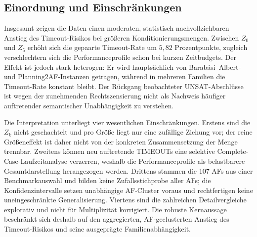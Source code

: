\subsection{Einordnung und Einschränkungen}
\label{subsec:empirical-stable-z-limitations}

Insgesamt zeigen die Daten einen moderaten, statistisch nachvollziehbaren
Anstieg des Timeout-Risikos bei größeren Konditionierungsmengen. Zwischen
\(Z_0\) und \(Z_5\) erhöht sich die gepaarte Timeout-Rate um \(5{,}82\)
Prozentpunkte, zugleich verschlechtern sich die Performanceprofile schon
bei kurzen Zeitbudgets. Der Effekt ist jedoch stark heterogen: Er wird
hauptsächlich von Barabási--Albert- und Planning2AF-Instanzen getragen,
während in mehreren Familien die Timeout-Rate konstant bleibt. Der
Rückgang beobachteter UNSAT-Abschlüsse ist wegen der zunehmenden
Rechtszensierung nicht als Nachweis häufiger auftretender semantischer
Unabhängigkeit zu verstehen.

Die Interpretation unterliegt vier wesentlichen Einschränkungen. Erstens
sind die \(Z_k\) nicht geschachtelt und pro Größe liegt nur eine zufällige
Ziehung vor; der reine Größeneffekt ist daher nicht von der konkreten
Zusammensetzung der Menge trennbar. Zweitens können neu auftretende
TIMEOUTs eine selektive Complete-Case-Laufzeitanalyse verzerren, weshalb die
Performanceprofile als belastbarere Gesamtdarstellung herangezogen werden.
Drittens stammen die 107 AFs aus einer Benchmarkauswahl und bilden keine
Zufallsstichprobe aller AFs; die Konfidenzintervalle setzen unabhängige
AF-Cluster voraus und rechtfertigen keine uneingeschränkte Generalisierung.
Viertens sind die zahlreichen Detailvergleiche explorativ und nicht für
Multiplizität korrigiert. Die robuste Kernaussage beschränkt sich deshalb
auf den aggregierten, AF-geclusterten Anstieg des Timeout-Risikos und seine
ausgeprägte Familienabhängigkeit.